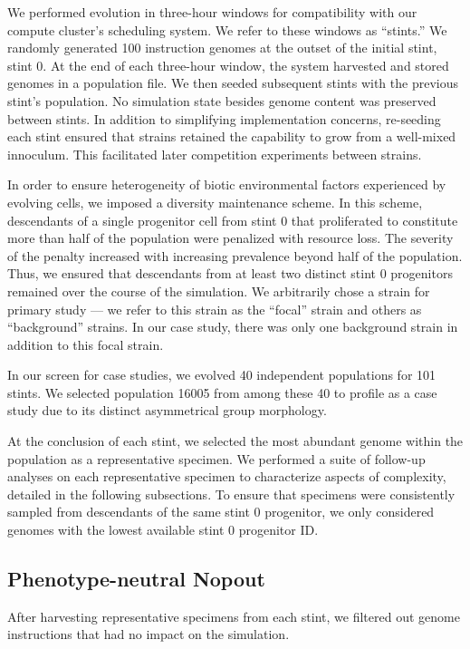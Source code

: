 We performed evolution in three-hour windows for compatibility with our compute cluster's scheduling system.
We refer to these windows as ``stints.''
We randomly generated 100 instruction genomes at the outset of the initial stint, stint 0.
At the end of each three-hour window, the system harvested and stored genomes in a population file.
We then seeded subsequent stints with the previous stint's population.
No simulation state besides genome content was preserved between stints.
In addition to simplifying implementation concerns, re-seeding each stint ensured that strains retained the capability to grow from a well-mixed innoculum.
This facilitated later competition experiments between strains.

In order to ensure heterogeneity of biotic environmental factors experienced by evolving cells, we imposed a diversity maintenance scheme.
In this scheme, descendants of a single progenitor cell from stint 0 that proliferated to constitute more than half of the population were penalized with resource loss.
The severity of the penalty increased with increasing prevalence beyond half of the population.
Thus, we ensured that descendants from at least two distinct stint 0 progenitors remained over the course of the simulation.
We arbitrarily chose a strain for primary study --- we refer to this strain as the ``focal'' strain and others as ``background'' strains.
In our case study, there was only one background strain in addition to this focal strain.

In our screen for case studies, we evolved 40 independent populations for 101 stints.
We selected population 16005 from among these 40 to profile as a case study due to its distinct asymmetrical group morphology.

At the conclusion of each stint, we selected the most abundant genome within the population as a representative specimen.
We performed a suite of follow-up analyses on each representative specimen to characterize aspects of complexity, detailed in the following subsections.
To ensure that specimens were consistently sampled from descendants of the same stint 0 progenitor, we only considered genomes with the lowest available stint 0 progenitor ID.

\subsection{Phenotype-neutral Nopout}
\label{sec:phenotype_neutral_nopout}

After harvesting representative specimens from each stint, we filtered out genome instructions that had no impact on the simulation.

